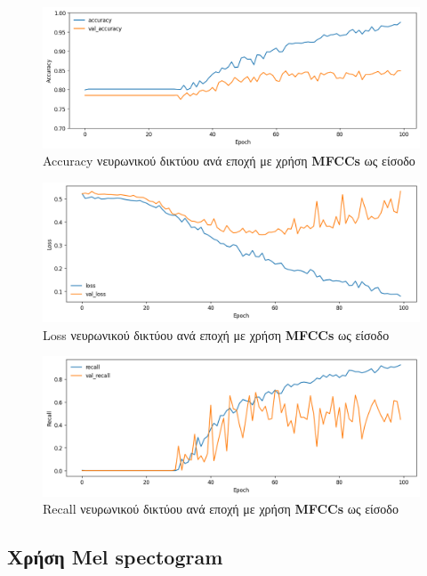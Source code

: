 \documentclass[../main.tex]{subfiles}
\begin{document}
\begin{figure}[H]
	\center
	\includegraphics[width=\textwidth]{../images/mfcc_accuracy.png}
	\caption{Accuracy νευρωνικού δικτύου ανά εποχή με χρήση \textbf{MFCCs} ως
		είσοδο}
	\label{mfcc_accuracy}
\end{figure}
\begin{figure}[H]
	\center
	\includegraphics[width=\textwidth]{../images/mfcc_loss.png}
	\caption{Loss νευρωνικού δικτύου ανά εποχή με χρήση \textbf{MFCCs} ως
		είσοδο}
	\label{mfcc_loss}
\end{figure}
\begin{figure}[H]
	\center
	\includegraphics[width=\textwidth]{../images/mfcc_recall.png}
	\caption{Recall νευρωνικού δικτύου ανά εποχή με χρήση \textbf{MFCCs} ως
		είσοδο}
	\label{mfcc_recall}
\end{figure}


\subsection{Χρήση Mel spectogram}
\end{document}
